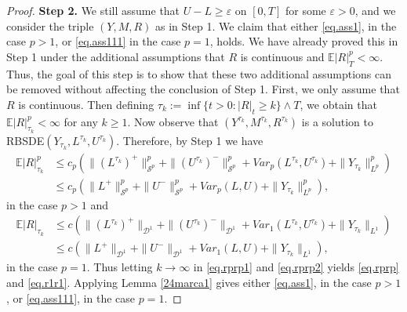 \documentclass[11pt,a4paper,reqno]{amsart}
\theoremstyle{definition}
\numberwithin{equation}{section}
\begin{document}
\begin{proof}
{\bf Step 2.} 
We still assume that $U-L\ge\varepsilon$ on $[0,T]$ for some $\varepsilon>0$,
and we consider  the triple  $(Y,M,R)$ as in Step 1. 
We claim    that either \eqref{eq.ass1}, in the case $p>1$, or 
\eqref{eq.ass111}  in the case $p=1$, holds.
We have already proved  this in Step 1 under the additional assumptions that $R$ is continuous 
and $\mathbb E|R|^p_T<\infty$. 
Thus, the goal of this step is to show that these two additional 
assumptions can be removed without affecting the conclusion of Step 1.
First, we only assume that $R$ is continuous. 
Then defining  $\tau_k:=\inf\{t>0: |R|_t\ge k\}\wedge T$, 
we obtain that $\mathbb E|R|^p_{\tau_k}<\infty$ for any $k\ge 1$. 
Now observe that $(Y^{\tau_k},M^{\tau_k},R^{\tau_k})$ 
is a solution to RBSDE$(Y_{\tau_k}, L^{\tau_k},U^{\tau_k})$. Therefore, by Step 1 we have
\begin{equation}
\label{eq.rprp1}
\begin{split}
\mathbb E|R|_{\tau_k}^p&\le c_p(\|(L^{\tau_k})^+\|_{\mathcal S^p}^p
+\|(U^{\tau_k})^-\|_{\mathcal S^p}^p+ Var_p(L^{\tau_k},U^{\tau_k})+\|Y_{\tau_k}\|^p_{L^p})\\&
\le c_p(\|L^+\|_{\mathcal S^p}^p+\|U^-\|_{\mathcal S^p}^p+ Var_p(L,U)+\|Y_{\tau_k}\|^p_{L^p}),
\end{split}
\end{equation}
in the case $p>1$ and
\begin{equation}
\label{eq.rprp2}
\begin{split}
\mathbb E|R|_{\tau_k}&\le c(\|(L^{\tau_k})^+\|_{\mathcal D^1}
+\|(U^{\tau_k})^-\|_{\mathcal D^1}+ Var_1(L^{\tau_k},U^{\tau_k})+\|Y_{\tau_k}\|_{L^1})
\\&
\le c(\|L^+\|_{\mathcal D^1}+\|U^-\|_{\mathcal D^1}+ Var_1(L,U)+\|Y_{\tau_k}\|_{L^1}),
\end{split}
\end{equation}
in the case $p=1$. 
Thus letting $k\to \infty$ in \eqref{eq.rprp1} and  \eqref{eq.rprp2}  yields \eqref{eq.rprp} and \eqref{eq.r1r1}.  
Applying Lemma \ref{24marca1} gives either \eqref{eq.ass1}, in the case $p>1$, or \eqref{eq.ass111}, in the  case $p=1$. 


\end{proof}
\end{document}
